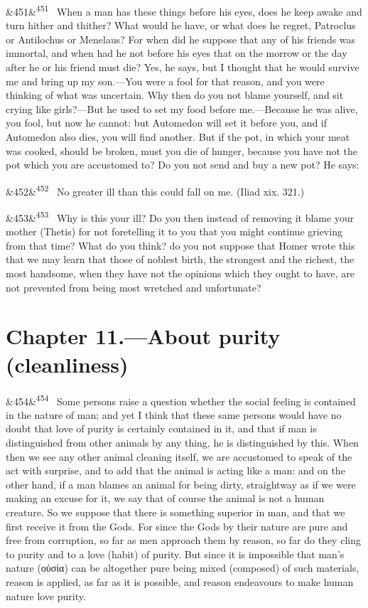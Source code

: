 \documentclass[12pt]{article}
\newcommand{\para}[1][]{\par\noindent\ifx&#1&\else\textsuperscript{\footnotesize #1}~\fi}
\begin{document}
\para[451] When a man has these things before his eyes, does he keep awake and turn hither and thither? What would he have, or what does he regret, Patroclus or Antilochus or Menelaus? For when did he suppose that any of his friends was immortal, and when had he not before his eyes that on the morrow or the day after he or his friend must die? Yes, he says, but I thought that he would survive me and bring up my son.—You were a fool for that reason, and you were thinking of what was uncertain. Why then do you not blame yourself, and sit crying like girls?—But he used to set my food before me.—Because he was alive, you fool, but now he cannot: but Automedon will set it before you, and if Automedon also dies, you will find another. But if the pot, in which your meat was cooked, should be broken, must you die of hunger, because you have not the pot which you are accustomed to? Do you not send and buy a new pot? He says:

\para[452] No greater ill than this could fall on me. (Iliad xix. 321.)

\para[453] Why is this your ill? Do you then instead of removing it blame your mother (Thetis) for not foretelling it to you that you might continue grieving from that time? What do you think? do you not suppose that Homer wrote this that we may learn that those of noblest birth, the strongest and the richest, the most handsome, when they have not the opinions which they ought to have, are not prevented from being most wretched and unfortunate?

\section*{Chapter 11.---About purity (cleanliness)}

\para[454] Some persons raise a question whether the social feeling is contained in the nature of man; and yet I think that these same persons would have no doubt that love of purity is certainly contained in it, and that if man is distinguished from other animals by any thing, he is distinguished by this. When then we see any other animal cleaning itself, we are accustomed to speak of the act with surprise, and to add that the animal is acting like a man: and on the other hand, if a man blames an animal for being dirty, straightway as if we were making an excuse for it, we say that of course the animal is not a human creature. So we suppose that there is something superior in man, and that we first receive it from the Gods. For since the Gods by their nature are pure and free from corruption, so far as men approach them by reason, so far do they cling to purity and to a love (habit) of purity. But since it is impossible that man's nature (οὐσία) can be altogether pure being mixed (composed) of such materials, reason is applied, as far as it is possible, and reason endeavours to make human nature love purity.
\end{document}
